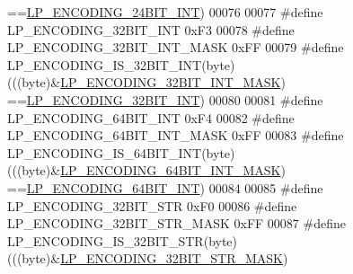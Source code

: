 \begin{DoxyCode}
{      ==}\hyperlink{listpack_8c_a431020d4a3ee70b22b181b52fd231a77}{LP\_ENCODING\_24BIT\_INT}\textcolor{preprocessor}{)}
00076 
00077 \textcolor{preprocessor}{#}\textcolor{preprocessor}{define} \textcolor{preprocessor}{LP\_ENCODING\_32BIT\_INT} 0xF3
00078 \textcolor{preprocessor}{#}\textcolor{preprocessor}{define} \textcolor{preprocessor}{LP\_ENCODING\_32BIT\_INT\_MASK} 0xFF
00079 \textcolor{preprocessor}{#}\textcolor{preprocessor}{define} \textcolor{preprocessor}{LP\_ENCODING\_IS\_32BIT\_INT}\textcolor{preprocessor}{(}\textcolor{preprocessor}{byte}\textcolor{preprocessor}{)} \textcolor{preprocessor}{(}\textcolor{preprocessor}{(}\textcolor{preprocessor}{(}\textcolor{preprocessor}{byte}\textcolor{preprocessor}{)}\textcolor{preprocessor}{&}\hyperlink{listpack_8c_a91afb1463912e502f01583ece843b06d}{LP\_ENCODING\_32BIT\_INT\_MASK}\textcolor{preprocessor}{)}\textcolor{preprocessor}{
      ==}\hyperlink{listpack_8c_aaf5d2cb51cf79d9609347c1cf7985711}{LP\_ENCODING\_32BIT\_INT}\textcolor{preprocessor}{)}
00080 
00081 \textcolor{preprocessor}{#}\textcolor{preprocessor}{define} \textcolor{preprocessor}{LP\_ENCODING\_64BIT\_INT} 0xF4
00082 \textcolor{preprocessor}{#}\textcolor{preprocessor}{define} \textcolor{preprocessor}{LP\_ENCODING\_64BIT\_INT\_MASK} 0xFF
00083 \textcolor{preprocessor}{#}\textcolor{preprocessor}{define} \textcolor{preprocessor}{LP\_ENCODING\_IS\_64BIT\_INT}\textcolor{preprocessor}{(}\textcolor{preprocessor}{byte}\textcolor{preprocessor}{)} \textcolor{preprocessor}{(}\textcolor{preprocessor}{(}\textcolor{preprocessor}{(}\textcolor{preprocessor}{byte}\textcolor{preprocessor}{)}\textcolor{preprocessor}{&}\hyperlink{listpack_8c_a3a5c4cb907946391c28b8202369122b7}{LP\_ENCODING\_64BIT\_INT\_MASK}\textcolor{preprocessor}{)}\textcolor{preprocessor}{
      ==}\hyperlink{listpack_8c_af93eef022c1590a9a592384e54df54c4}{LP\_ENCODING\_64BIT\_INT}\textcolor{preprocessor}{)}
00084 
00085 \textcolor{preprocessor}{#}\textcolor{preprocessor}{define} \textcolor{preprocessor}{LP\_ENCODING\_32BIT\_STR} 0xF0
00086 \textcolor{preprocessor}{#}\textcolor{preprocessor}{define} \textcolor{preprocessor}{LP\_ENCODING\_32BIT\_STR\_MASK} 0xFF
00087 \textcolor{preprocessor}{#}\textcolor{preprocessor}{define} \textcolor{preprocessor}{LP\_ENCODING\_IS\_32BIT\_STR}\textcolor{preprocessor}{(}\textcolor{preprocessor}{byte}\textcolor{preprocessor}{)} \textcolor{preprocessor}{(}\textcolor{preprocessor}{(}\textcolor{preprocessor}{(}\textcolor{preprocessor}{byte}\textcolor{preprocessor}{)}\textcolor{preprocessor}{&}\hyperlink{listpack_8c_a80e656069b508dbd635201bcceaff88f}{LP\_ENCODING\_32BIT\_STR\_MASK}\textcolor{preprocessor}{)}\textcolor{preprocessor}{
}
\end{DoxyCode}
